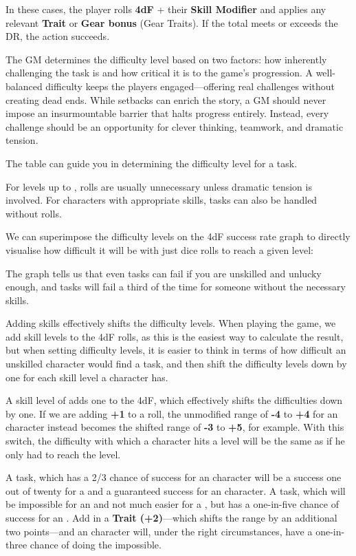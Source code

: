 In these cases, the player rolls \textbf{4dF} + their \textbf{Skill Modifier} and applies any relevant \textbf{Trait} or \textbf{Gear bonus} (Gear Traits). If the total meets or exceeds the DR, the action succeeds.

The GM determines the difficulty level based on two factors: how inherently challenging the task is and how critical it is to the game’s progression. A well-balanced difficulty keeps the players engaged—offering real challenges without creating dead ends. While setbacks can enrich the story, a GM should never impose an insurmountable barrier that halts progress entirely. Instead, every challenge should be an opportunity for clever thinking, teamwork, and dramatic tension.

The table  can guide you in determining the difficulty level for a task.

For levels up to , rolls are usually unnecessary unless dramatic tension is involved. For characters with appropriate skills,  tasks can also be handled without rolls.

We can superimpose the difficulty levels on the 4dF success rate graph to directly visualise how difficult it will be with just dice rolls to reach a given level:



The graph tells us that even  tasks can fail if you are unskilled and unlucky enough, and  tasks will fail a third of the time for someone without the necessary skills.

Adding skills effectively shifts the difficulty levels. When playing the game, we add skill levels to the 4dF rolls, as this is the easiest way to calculate the result, but when setting difficulty levels, it is easier to think in terms of how difficult an unskilled character would find a task, and then shift the difficulty levels down by one for each skill level a character has.

A skill level of \Novice adds one to the 4dF, which effectively shifts the difficulties down by one. If we are adding \textbf{+1} to a roll, the unmodified range of \textbf{-4} to \textbf{+4} for an \Untrained character instead becomes the shifted range of \textbf{-3} to \textbf{+5}, for example. With this switch, the difficulty with which a \Novice character hits a  level will be the same as if he only had to reach the  level.

A  task, which has a 2/3 chance of success for an \Untrained character will be a success one out of twenty for a \Novice and a guaranteed success for an \Expert character. A  task, which will be impossible for an \Untrained and not much easier for a \Novice, but has a one-in-five chance of success for an \Expert. Add in a \textbf{Trait (+2)}---which shifts the range by an additional two points---and an \Expert character will, under the right circumstances, have a one-in-three chance of doing the impossible.

